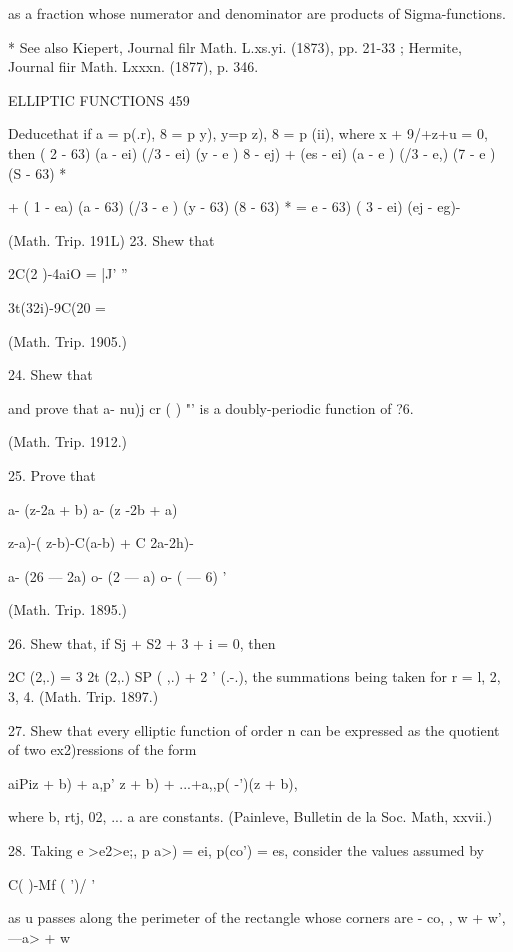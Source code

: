 {as a fraction whose numerator and denominator are products of Sigma-functions. 

* See also Kiepert, Journal filr Math. L.xs.yi. (1873), pp. 21-33 ; Hermite, Journal fiir Math. 
Lxxxn. (1877), p. 346. 



ELLIPTIC FUNCTIONS 459 

Deducethat if a = p(.r), 8 = p y), y=p z), 8 = p (ii), where x + 9/+z+u = 0, then 
( 2 - 63)  (a - ei) (/3 - ei) (y - e )  8 - ej)   
+ (es - ei)  (a - e ) (/3 - e,) (7 - e ) (S - 63) * 

+ ( 1 - ea)  (a - 63) (/3 - e ) (y - 63) (8 - 63) * =  e  - 63) ( 3 - ei) (ej - eg)- 

(Math. Trip. 191L) 
23. Shew that 

2C(2 )-4aiO = |J' ''  



3t(32i)-9C(20 = 






(Math. Trip. 1905.) 

24. Shew that 

and prove that a-  nu)j cr ( ) "' is a doubly-periodic function of ?6. 

(Math. Trip. 1912.) 

25. Prove that 

a- (z-2a + b) a- (z -2b + a) 



  z-a)-( z-b)-C(a-b) + C 2a-2h)- 



a- (26 — 2a) o- (2 — a) o- (  — 6) ' 

(Math. Trip. 1895.) 

26. Shew that, if Sj + S2 +  3 +  i = 0, then 

 2C (2,.)   = 3  2t (2,.)   SP ( ,.)  + 2 ' (.-.), 
the summations being taken for r = l, 2, 3, 4. (Math. Trip. 1897.) 

27. Shew that every elliptic function of order n can be expressed as the quotient of 
two ex2)ressions of the form 

aiPiz + b) + a,p' z + b) + ...+a,,p( -')(z + b), 

where b, rtj, 02, ... a  are constants. (Painleve, Bulletin de la Soc. Math, xxvii.) 

28. Taking e >e2>e;, p a>) = ei, p(co') = es, 
consider the values assumed by 

C( )-Mf ( ')/ ' 

as u passes along the perimeter of the rectangle whose corners are - co,  , w + w', —a> + w 

}
